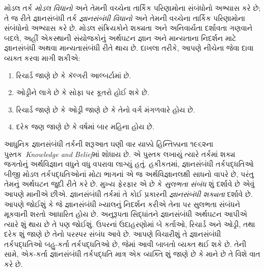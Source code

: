 \documentclass[../../../include/open-logic-section]{subfiles}
\begin{document}


મોડલ તર્ક \emph{મોડલ વિધાનો} અને તેમની વચ્ચેના તાર્કિક પરિણામોના
સંબંધોનો અભ્યાસ કરે છે; તે જ રીતે જ્ઞાનસંબંધી તર્ક
\emph{જ્ઞાનસંબંધી વિધાનો} અને તેમની વચ્ચેના તાર્કિક પરિણામોના
સંબંધોનો અભ્યાસ કરે છે. મોડલ સંક્રિયકોને શક્યતા અને અનિવાર્યતા
દર્શાવતા ગણવાને બદલે, અહીં એકસ્થાની સંયોજકોનું અર્થઘટન જ્ઞાન અને
માન્યતાના નિદર્શન માટે જ્ઞાનસંબંધી અથવા માન્યતાસંબંધી રીતે થાય છે.
દાખલા તરીકે, આપણે નીચેના જેવા દાવા વ્યક્ત કરવા માગી શકીએ:

\begin{enumerate}
\item રિચાર્ડ જાણે છે કે કૅલ્ગરી આલ્બર્ટામાં છે.
\item ઓડ્રીને લાગે છે કે સોફા પર કૂતરો હોઈ શકે છે.
\item રિચાર્ડ જાણે છે કે ઓડ્રી જાણે છે કે તેનો વર્ગ મંગળવારે હોય છે.
\item દરેક જણ જાણે છે કે વર્ષમાં બાર મહિના હોય છે.
\end{enumerate}
આધુનિક જ્ઞાનસંબંધી તર્કની શરૂઆત ઘણી વાર યાક્કો હિન્તિક્કાના
૧૯૬૨ના પુસ્તક~\emph{Knowledge and Belief}માં શોધાય છે. એ પુસ્તક
લખાયું ત્યારે તર્કમાં શક્ય જગતોનું અર્થવિજ્ઞાન વધુને વધુ વપરાવા
લાગ્યું હતું. હકીકતમાં, જ્ઞાનસંબંધી તર્કપદ્ધતિઓ બીજી મોડલ
તર્કપદ્ધતિઓનાં મોટા ભાગનાં એ જ અર્થવિજ્ઞાનલક્ષી સાધનો વાપરે છે,
પરંતુ તેમનું અર્થઘટન જુદી રીતે કરે છે. મુખ્ય ફેરફાર એ છે કે
\emph{સુલભતા સંબંધ} શું દર્શાવે છે એવું આપણે માનીએ છીએ.
જ્ઞાનસંબંધી તર્કમાં તે કોઈ પ્રકારની \emph{જ્ઞાનસંબંધી શક્યતા}
દર્શાવે છે. આપણે જોઈશું કે જે જ્ઞાનસંબંધી ખ્યાલનું નિદર્શન કરીએ
તેના પર સુલભતા સંબંધને મૂકવાની શરતો આધારિત હોય છે. અનુરૂપતા
સિદ્ધાંતને જ્ઞાનસંબંધી અર્થઘટન આપીએ ત્યારે શું થાય છે તે પણ
જોઈશું. ઉપરનાં ઉદાહરણોમાં બે કર્તાઓ, રિચાર્ડ અને ઓડ્રી, તથા
દરેક શું જાણે છે તેનો પરસ્પર સંબંધ આવે છે. આપણે વિચારીશું તે
જ્ઞાનસંબંધી તર્કપદ્ધતિઓ બહુ-કર્તા તર્કપદ્ધતિઓ છે, જેમાં આવી બાબતો
વ્યક્ત થઈ શકે છે. તેની સામે, એક-કર્તા જ્ઞાનસંબંધી તર્કપદ્ધતિ
માત્ર એક વ્યક્તિ શું જાણે છે કે માને છે તે વિશે વાત કરે છે.
\end{document}
